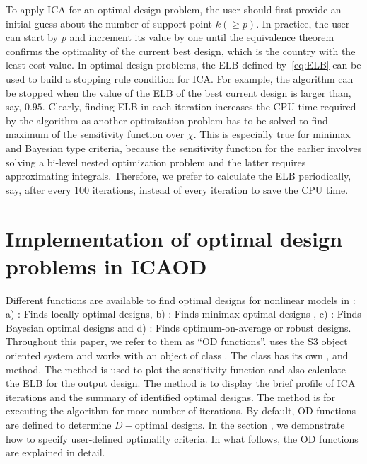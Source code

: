 To apply ICA for an optimal design problem, the user should first provide an initial guess about the number of support point $k (\geq p)$.
In practice, the user can start by $p$ and  increment its value by one  until  the equivalence theorem confirms the optimality of the current best  design, which is the country with the least cost value.
In optimal design problems, the ELB defined by~\eqref{eq:ELB} can  be used to build a stopping rule condition for ICA. For example, the algorithm can be stopped  when the value of the  ELB of the best current design is larger than, say,  $0.95$. Clearly, finding ELB in each iteration increases the CPU time required by the algorithm  as another  optimization problem has to be solved to find maximum of the sensitivity function over $\chi$. This is especially true for minimax and Bayesian type criteria, because  the sensitivity function for the earlier involves solving a bi-level nested optimization problem  and the latter requires approximating  integrals. Therefore, we prefer to calculate  the ELB  periodically, say, after every $100$  iterations, instead of every iteration to save the CPU time.


\section{Implementation of optimal design problems in  ICAOD}
\label{sec:ICAOD-implementation}
Different functions are available to find optimal designs for nonlinear models in : a) : Finds  locally optimal designs,  b) : Finds minimax optimal designs , c) : Finds Bayesian optimal designs and d) : Finds optimum-on-average or robust designs.
Throughout this paper, we refer to them as ``OD  functions''.
 uses the S3 object oriented  system and  works with  an object of class .  The class  has its own ,   and  method. The  method is used to plot the sensitivity function and also calculate the ELB for the output design. The  method is to display the brief profile of ICA iterations and the summary of identified optimal designs. The  method is for executing  the algorithm for more number of iterations.
By default, OD functions are defined to determine $D-$optimal designs. In  the section , %
we demonstrate how  to specify user-defined optimality criteria.
In what follows, the OD functions are explained in detail.


